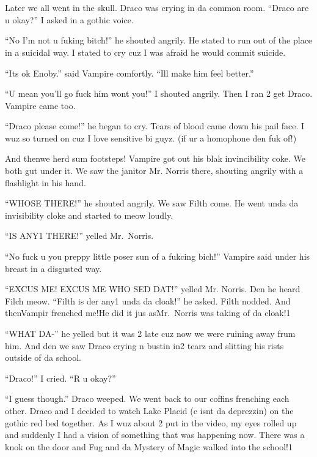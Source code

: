 \section{\chaptername~\thesection}



Later we all went in the skull. Draco was crying in da common room. \enquote{Draco are u okay?} I asked in a gothic voice.

\enquote{No I'm not u fuking bitch!} he shouted angrily. He stated to run out of the place in a suicidal way. I stated to cry cuz I was afraid he would commit suicide.

\enquote{Its ok Enoby.} said Vampire comfortly. \enquote{Ill make him feel better.}

\enquote{U mean you'll go fuck him wont you!} I shouted angrily. Then I ran 2 get Draco. Vampire came too.

\enquote{Draco please come!} he began to cry. Tears of blood came down his pail face. I wuz so turned on cuz I love sensitive bi guyz. (if ur a homophone den fuk of!)

And then\dotfill we herd sum footsteps! Vampire got out his blak invincibility coke. We both gut under it. We saw the janitor Mr. Norris there, shouting angrily with a flashlight in his hand.

\enquote{WHOSE THERE\@!} he shouted angrily. We saw Filth come. He went unda da invisibility cloke and started to meow loudly.

\enquote{IS ANY1 THERE\@!} yelled Mr.~Norris.

\enquote{No fuck u you preppy little poser sun of a fukcing bich!} Vampire said under his breast in a disgusted way.

\enquote{EXCUS ME\@! EXCUS ME WHO SED DAT\@!} yelled Mr. Norris. Den he heard Filch meow. \enquote{Filth is der any1 unda da cloak!} he asked. Filth nodded. And then\dotfill Vampir frenched me!\newline He did it jus as\dotfill Mr.~Norris was taking of da cloak!1

\enquote{WHAT DA-} he yelled but it was 2 late cuz now we were ruining away frum him. And den we saw Draco crying n bustin in2 tearz and slitting his rists outside of da school.

\enquote{Draco!} I cried. \enquote{R u okay?}

\enquote{I guess though.} Draco weeped. We went back to our coffins frenching each other. Draco and I decided to watch Lake Placid (c isnt da deprezzin) on the gothic red bed together. As I wuz about 2 put in the video, my eyes rolled up and suddenly I had a vision of something that was happening now. There was a knok on the door and Fug and da Mystery of Magic walked into the school!1

